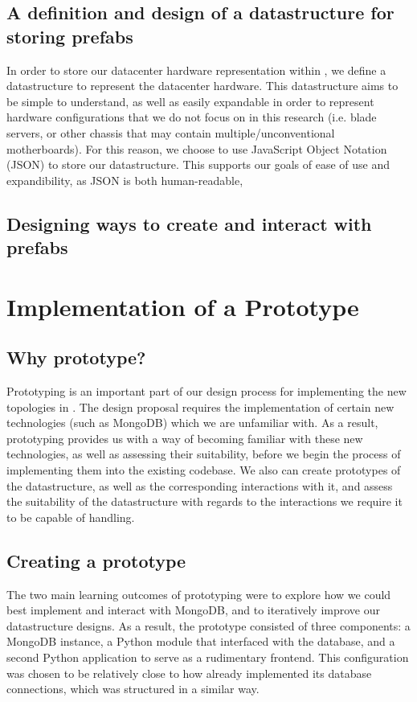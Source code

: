 \documentclass[11pt]{article}
\begin{document}
	\subsection{A definition and design of a datastructure for storing prefabs}
		In order to store our datacenter hardware representation within \opendc{}, we define a datastructure to represent the datacenter hardware. 
		This datastructure aims to be simple to understand, as well as easily expandable in order to represent hardware configurations that we do not focus on in this research (i.e. blade servers, or other chassis that may contain multiple/unconventional motherboards). 
		For this reason, we choose to use JavaScript Object Notation (JSON) to store our datastructure. 
		This supports our goals of ease of use and expandibility, as JSON is both human-readable, 
	
	\subsection{Designing ways to create and interact with prefabs}

\section{Implementation of a Prototype}

	\subsection{Why prototype?}
		Prototyping is an important part of our design process for implementing the new topologies in \opendc{}.
		The design proposal requires the implementation of certain new technologies (such as MongoDB) which we are unfamiliar with.
		As a result, prototyping provides us with a way of becoming familiar with these new technologies, as well as assessing their suitability, before we begin the process of implementing them into the existing \opendc{} codebase.
		We also can create prototypes of the datastructure, as well as the corresponding interactions with it, and assess the suitability of the datastructure with regards to the interactions we require it to be capable of handling.
	
	\subsection{Creating a prototype}
		The two main learning outcomes of prototyping were to explore how we could best implement and interact with MongoDB, and to iteratively improve our datastructure designs.
		As a result, the prototype consisted of three components: a MongoDB instance, a Python module that interfaced with the database, and a second Python application to serve as a rudimentary frontend. 
		This configuration was chosen to be relatively close to how \opendc{} already implemented its database connections, which was structured in a similar way. 
	
\end{document}
